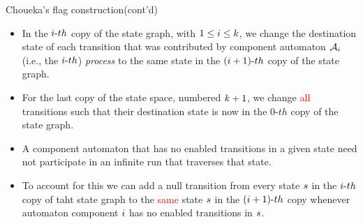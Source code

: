 \documentclass[12pt]{beamer}
\newcommand{\Automaton}{\mathcal{A}}
\newcommand{\kk}{\mathnormal{k}}
\newcommand{\ii}{\mathnormal{i}}
\newcommand{\state}{\mathnormal{s}}
\begin{document}
\begin{frame}{Choueka's flag construction(cont'd)}
		\begin{itemize}
			\item In the $\ii\text{-}th$ copy of the state graph, with $1 \leq \ii \leq \mathnormal{k}$, we change the destination state of each transition that was contributed by component automaton $\Automaton_{\ii}$ (i.e., the $\ii\text{-}th$) \textit{process} to the same state in the $(\ii+1)\text{-}th$ copy of the state graph.
			\item For the last copy of the state space, numbered $\kk+1$, we change \textcolor{red}{all} transitions such that their destination state is now in the $0\text{-}th$ copy of the state graph.
			\item A component automaton that has no enabled transitions in a given state need not participate in an infinite run that traverses that state.
			\item To account for this we can add a null transition from every state $\state$ in the $\ii\text{-}th$ copy of taht state graph to the \textcolor{red}{same} state $\state$ in the $(\ii+1)\text{-}th$ copy whenever automaton component $\ii$ has no enabled transitions in $\state$.
		\end{itemize}
\end{frame}
\end{document}
